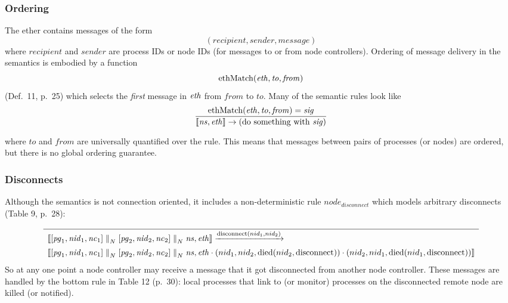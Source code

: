 \documentclass[10pt]{article}
\begin{document}
\subsubsection*{Ordering}

The ether contains messages of the form
%
\begin{equation*}
(\mathit{recipient}, \mathit{sender}, \mathit{message})
\end{equation*}
%
where $\mathit{recipient}$ and $\mathit{sender}$ are process IDs or node IDs
(for messages to or from node controllers).  Ordering of message delivery in
the semantics is embodied by a function 
%
\begin{equation*}
\mathrm{ethMatch}(\mathit{eth}, \mathit{to}, \mathit{from})
\end{equation*}
%
(Def.~11, p.~25) which selects the \emph{first} message in $\mathit{eth}$ from
$\mathit{from}$ to $\mathit{to}$. Many of the semantic rules look like
%
\begin{equation*}
\frac{%
\semEthMatch{\semEth}{\mathit{to}}{\mathit{from}} = \mathit{sig}
}{%
\semSystem{\semNs}{\semEth} \rightarrow \text{(do something with $\mathit{sig}$)} 
}
\end{equation*}

where $\mathit{to}$ and $\mathit{from}$ are universally quantified over the
rule. This means that messages between pairs of processes (or nodes) are
ordered, but there is no global ordering guarantee. 

\subsubsection*{Disconnects}

Although the semantics is not connection oriented, it includes a
non-deterministic rule $\mathit{node}_\mathit{disconnect}$ which models
arbitrary disconnects (Table 9, p.~28):
%
{\small
\begin{equation*}
\frac{}{%
  \begin{array}{l}
  \semSystem{\semStdNode{1} \semParN \semStdNode{2} \semParN \semNs}{\semEth} 
\xrightarrow{\semDisconnect(nid_1, nid_2)} \\[0.5em] 
  \semSystem{\semStdNode{1} \semParN \semStdNode{2} \semParN \semNs}
    {\semEth \cdot (nid_1, nid_2, \semDied{nid_2}{\semDisconnect})
             \cdot (nid_2, nid_1, \semDied{nid_1}{\semDisconnect})
    }
  \end{array}
} 
\end{equation*}
}
%
So at any one point a node controller may receive a message that it got
disconnected from another node controller. These messages are handled by the
bottom rule in Table 12 (p.~30): local processes that link to (or monitor)
processes on the disconnected remote node are killed (or notified). 
\end{document}
